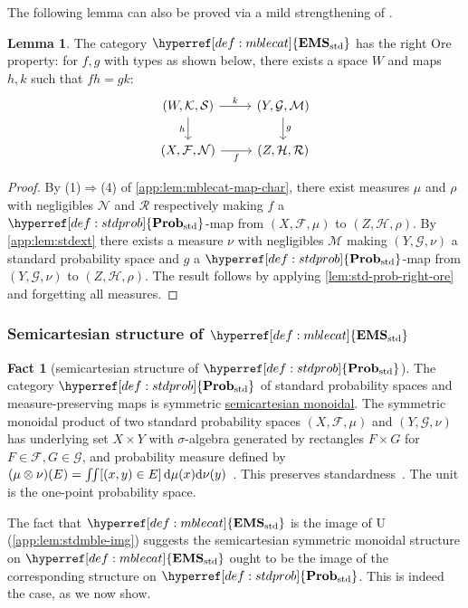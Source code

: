 \documentclass[
  sigconf,
  screen, ]{acmart}
\theoremstyle{definition}
\newtheorem{lemma}[theorem]{Lemma}
\newtheorem{fact}[theorem]{Fact}
\newcommand\calF{\mathcal F}
\newcommand\calG{\mathcal G}
\newcommand\calH{\mathcal H}
\newcommand\calK{\mathcal K}
\newcommand\calM{\mathcal M}
\newcommand\calN{\mathcal N}
\newcommand\calR{\mathcal R}
\newcommand\calS{\mathcal S}
\newcommand\commsquare[8]{
\begin{tikzcd}[ampersand replacement=\&]
{#1} \arrow[d, "{#4}"'] \arrow[r, "{#2}"] \& {#3} \arrow[d, "{#5}"] \\
{#6} \arrow[r, "{#7}"']                \& {#8}
\end{tikzcd}
}
\newcommand\nref[2]{\hyperref[#1]{#2}} \newcommand\checkhigh{{\huge{\color{red}\textbf{TODO: check}}}}
\newcommand\texforgetmu{\mathrm{U}}
\newcommand\forgetmu{{\nref{def:forgetmu}{\texforgetmu}}}
\newcommand\texStdProb{\mathbf{Prob}_{\rm std}}
\newcommand\StdProb{{\nref{def:stdprob}{\texStdProb}}}
\newcommand\texStdMble{\mathbf{EMS}_{\rm std}}
\newcommand\StdMble{{\nref{def:mblecat}{\texStdMble}}}
\begin{document}
The following lemma can also be proved via a mild
strengthening of \citet[Definition 3.1]{wendt1998change}.

\begin{lemma} \label{app:lem:mble-right-ore}
  The category $\StdMble$
  has the right Ore property: for $f,g$
  with types as shown below,
  there exists a space $W$ and maps $h,k$
  such that $fh = gk$:
  \[ \commsquare{(W,\calK,\calS)}{k}{(Y,\calG,\calM)}{h}{g}{(X,\calF,\calN)}{f}{(Z,\calH,\calR)} \]
\end{lemma}
\begin{proof}
  By 
  (1)$\Rightarrow$(4) of \cref{app:lem:mblecat-map-char},
  there exist measures $\mu$ and $\rho$
  with negligibles $\calN$ and $\calR$
  respectively making $f$ a $\StdProb$-map
  from $(X,\calF,\mu)$ to $(Z,\calH,\rho)$.
  By \cref{app:lem:stdext} there exists
  a measure $\nu$ with negligibles $\calM$
  making $(Y,\calG,\nu)$ a standard probability space
  and $g$ a $\StdProb$-map
  from $(Y,\calG,\nu)$ to $(Z,\calH,\rho)$.
  The result follows by applying
  \cref{lem:std-prob-right-ore} and forgetting all measures.
\end{proof}

\subsubsection{Semicartesian structure of $\StdMble$}

\begin{fact}[semicartesian structure of $\StdProb$] \label{app:lem:stdprob-semicart}
  The category $\StdProb$ of standard probability spaces
  and measure-preserving maps
  is symmetric \nref{app:def:semicartesian-monoidal-category}{semicartesian monoidal}.
  The symmetric monoidal product of two standard probability spaces
  $(X,\calF,\mu)$
  and $(Y,\calG,\nu)$
  has underlying set $X\times Y$
  with $\sigma$-algebra generated by rectangles
  $F\times G$ for $F\in\calF,G\in\calG$,
  and probability measure defined by
  $(\mu\otimes\nu)(E) = \iint [(x,y)\in E]\,{\rm d}\mu(x){\rm d}\nu(y)$~\cite[Definition 5.25]{axler2020measure}.
  This preserves standardness~\cite[p. 37, \S 2.7]{rohlin1949fundamental}.
  The unit is the one-point probability space.
\end{fact}

The fact that $\StdMble$
is the image of $\forgetmu$ (\cref{app:lem:stdmble-img})
suggests the semicartesian symmetric monoidal structure on $\StdMble$
ought to be the image of the corresponding structure on $\StdProb$.
This is indeed the case, as we now show.
\end{document}
